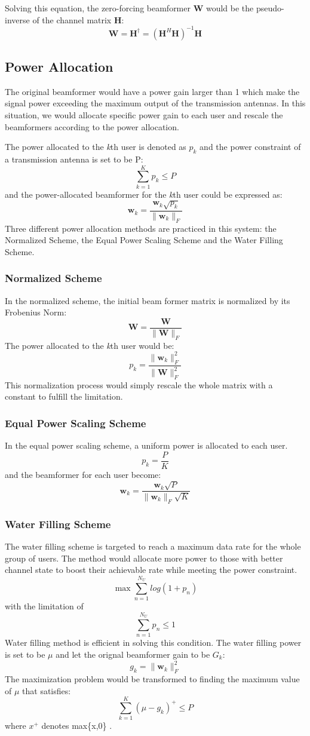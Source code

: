 \documentclass{article}
\begin{document}
\noindent
Solving this equation, the zero-forcing beamformer \textbf{W} would be the pseudo-inverse of the channel matrix \textbf{H}:
\[
\textbf{W} = \textbf{H}^{\dagger} = (\textbf{H}^H\textbf{H})^{-1}\textbf{H}
\]

\subsection{Power Allocation}
The original beamformer would have a power gain larger than 1 which make the signal power exceeding the maximum output of the transmission antennas.
In this situation, we would allocate specific power gain to each user and rescale the beamformers according to the power allocation.

\noindent
The power allocated to the \textit{k}th user is denoted as $p_k$ and the power constraint of a transmission antenna is set to be P:
\[\sum_{k=1}^K p_k \leq P\]
and the power-allocated beamformer for the \textit{k}th user could be expressed as:
\[\textbf{w}_k = \frac{\textbf{w}_k\sqrt{p_k}}{\lVert \textbf{w}_k \rVert_{F}}\]
Three different power allocation methods are practiced in this system:
the Normalized Scheme, the Equal Power Scaling Scheme and the Water Filling Scheme.
\subsubsection{Normalized Scheme}
In the normalized scheme, the initial beam former matrix is normalized by its Frobenius Norm:
\[
\textbf{W} = \frac{\textbf{W}}{\lVert \textbf{W} \rVert_{F}}
\]
The power allocated to the \textit{k}th user would be:
\[p_k = \frac{\lVert \textbf{w}_k \rVert_{F}^2}{\lVert \textbf{W} \rVert_{F}^2}\]
This normalization process would simply rescale the whole matrix with a constant to fulfill the limitation.

\subsubsection{Equal Power Scaling Scheme}
In the equal power scaling scheme, a uniform power is allocated to each user.
\[p_k = \frac{P}{K}\]
and the beamformer for each user become:
\[\textbf{w}_k = \frac{\textbf{w}_k\sqrt{P}}{\lVert \textbf{w}_k \rVert_{F}\sqrt{K}}\]
\subsubsection{Water Filling Scheme}
The water filling scheme is targeted to reach a maximum data rate for the whole group of users.
The method would allocate more power to those with better channel state to boost their achievable rate while meeting the power constraint.
$$
\max \sum_{n=1}^{N_U} log(1+p_n)
$$
with the limitation of
$$\sum_{n=1}^{N_U} p_n \leq 1$$
Water filling method is efficient in solving this condition.
The water filling power is set to be $\mu$ and let the orignal beamformer gain to be $G_k$:
\[g_k = \lVert \textbf{w}_k \rVert_{F}^2\]
The maximization problem would be transformed to finding the maximum value of $\mu$ that satisfies:
\[\sum_{k=1}^{K}(\mu-g_k)^+ \leq P\]
where ${x}^+$ denotes max\{x,0\} \cite{TY1}.
\end{document}
